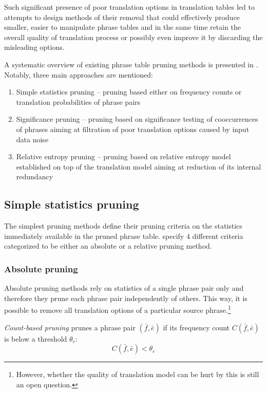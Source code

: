 Such significant presence of poor translation options in translation tables led to
attempts to design methods of their removal that could effectively produce smaller,
easier to manipulate phrase tables and in the same time retain the overall quality of
translation process or possibly even improve it by discarding the misleading options.

A systematic overview of existing phrase table pruning methods is presented in \citep{zens:systcomp}.
Notably, three main approaches are mentioned:
\begin{enumerate}
  \item Simple statistics pruning -- pruning based either on frequency counts or
    translation probabilities of phrase pairs
  \item Significance pruning -- pruning based on significance testing of
    cooccurrences of phrases aiming at filtration of poor translation options caused
    by input data noise
  \item Relative entropy pruning -- pruning based on relative entropy model established
    on top of the translation model aiming at reduction of its internal redundancy
\end{enumerate}

\subsection{Simple statistics pruning}
\label{sec:simple-statistics-pruning}

The simplest pruning methods define their pruning criteria on the statistics immediately
available in the pruned phrase table. \citet{zens:systcomp} specify 4 different criteria
categorized to be either an absolute or a relative pruning method.

\subsubsection*{Absolute pruning}

Absolute pruning methods rely on statistics of a single phrase pair only and therefore
they prune each phrase pair independently of others.
This way, it is possible to remove all translation options of a particular source
phrase.\footnote{However, whether the quality of translation model can be hurt by this is
still an open question.}

\emph{Count-based pruning} prunes a phrase pair $(\bar{f},\bar{e})$ if its frequency count
$C(\bar{f},\bar{e})$ is below a threshold $\theta_{c}$:
\begin{equation} \label{eq:count-based-pruning}
  C(\bar{f},\bar{e}) < \theta_{c}
\end{equation}

